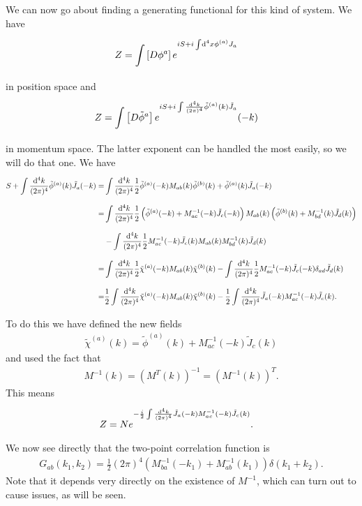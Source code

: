 We can now go about finding a generating functional for this kind of system. We have
\begin{align*}
	Z &= \int\limits_{}\left[D\phi^{a}\right]e^{iS + i\int\limits_{}^{}\dd[4]{x}\phi^{(a)}J_{a}}
\end{align*}
in position space and
\begin{align*}
	Z &= \int\limits_{}\left[D\tilde{\phi}^{a}\right]e^{iS + i\int\limits_{}^{}\frac{\dd[4]{k}}{(2\pi)^{4}}\tilde{\phi}^{(a)}(k)\tilde{J}_{a}}(-k)
\end{align*}
in momentum space. The latter exponent can be handled the most easily, so we will do that one. We have
\begin{align*}
	S + \int\limits_{}^{}\frac{\dd[4]{k}}{(2\pi)^{4}}\tilde{\phi}^{(a)}(k)\tilde{J}_{a}(-k) =& \int\limits_{}^{}\frac{\dd[4]{k}}{(2\pi)^{4}}\frac{1}{2}\tilde{\phi}^{(a)}(-k)M_{ab}(k)\tilde{\phi}^{(b)}(k) + \tilde{\phi}^{(a)}(k)\tilde{J}_{a}(-k) \\
	=& \int\limits_{}^{}\frac{\dd[4]{k}}{(2\pi)^{4}}\frac{1}{2}\left(\tilde{\phi}^{(a)}(-k) + M_{ac}^{-1}(-k)\tilde{J}_{c}(-k)\right)M_{ab}(k)\left(\tilde{\phi}^{(b)}(k) + M_{bd}^{-1}(k)\tilde{J}_{d}(k)\right) \\
	 &- \int\limits_{}^{}\frac{\dd[4]{k}}{(2\pi)^{4}}\frac{1}{2}M_{ac}^{-1}(-k)\tilde{J}_{c}(k)M_{ab}(k)M_{bd}^{-1}(k)\tilde{J}_{d}(k) \\
	=& \int\limits_{}^{}\frac{\dd[4]{k}}{(2\pi)^{4}}\frac{1}{2}\tilde{\chi}^{(a)}(-k)M_{ab}(k)\tilde{\chi}^{(b)}(k) - \int\limits_{}^{}\frac{\dd[4]{k}}{(2\pi)^{4}}\frac{1}{2}M_{ac}^{-1}(-k)\tilde{J}_{c}(-k)\delta_{ad}\tilde{J}_{d}(k) \\
	=& \frac{1}{2}\int\limits_{}^{}\frac{\dd[4]{k}}{(2\pi)^{4}}\tilde{\chi}^{(a)}(-k)M_{ab}(k)\tilde{\chi}^{(b)}(k) - \frac{1}{2}\int\limits_{}^{}\frac{\dd[4]{k}}{(2\pi)^{4}}\tilde{J}_{a}(-k)M_{ac}^{-1}(-k)\tilde{J}_{c}(k).
\end{align*}
To do this we have defined the new fields
\begin{align*}
	\tilde{\chi}^{(a)}(k) = \tilde{\phi}^{(a)}(k) + M_{ac}^{-1}(-k)\tilde{J}_{c}(k)
\end{align*}
and used the fact that
\begin{align*}
	M^{-1}(k) = (M^{T}(k))^{-1} = (M^{-1}(k))^{T}.
\end{align*}
This means
\begin{align*}
	Z &= Ne^{-\frac{i}{2}\int\limits_{}^{}\frac{\dd[4]{k}}{(2\pi)^{4}}\tilde{J}_{a}(-k)M_{ac}^{-1}(-k)\tilde{J}_{c}(k)}.
\end{align*}

We now see directly that the two-point correlation function is
\begin{align*}
	G_{ab}(k_{1}, k_{2}) = \frac{1}{2}(2\pi)^{4}\left(M_{ba}^{-1}(-k_{1}) + M_{ab}^{-1}(k_{1})\right)\delta(k_{1} + k_{2}).
\end{align*}
Note that it depends very directly on the existence of $M^{-1}$, which can turn out to cause issues, as will be seen.

